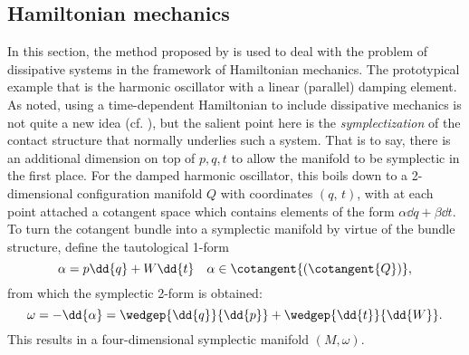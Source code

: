 \subsection{Hamiltonian mechanics}
\label{sssec:mendel_hamiltonian}
In this section, the method proposed by \citet{Mendel2021} is used to deal with the problem of dissipative systems in the framework of Hamiltonian mechanics. The prototypical example that is the harmonic oscillator with a linear (parallel) damping element. As noted, using a time-dependent Hamiltonian to include dissipative mechanics is not quite a new idea (cf. \citet{Dekker1981}), but the salient point here is the \emph{symplectization} of the contact structure that normally underlies such a system. That is to say, there is an additional dimension on top of $p, q, t$ to allow the manifold to be symplectic in the first place. For the damped harmonic oscillator, this boils down to a 2-dimensional configuration manifold $Q$ with coordinates $(q,\,t)$, with at each point attached a cotangent space which contains elements of the form $\alpha\dd{q} + \beta\dd{t}$. To turn the cotangent bundle into a symplectic manifold by virtue of the bundle structure, define the tautological 1-form
$$ \alpha = p\dd{q} + W\dd{t} \quad \alpha \in \cotangent{(\cotangent{Q})},$$
from which the symplectic 2-form is obtained:
$$ \omega = -\dd{\alpha} = \wedgep{\dd{q}}{\dd{p}} + \wedgep{\dd{t}}{\dd{W}}.$$
This results in a four-dimensional symplectic manifold $(M, \omega)$. 

